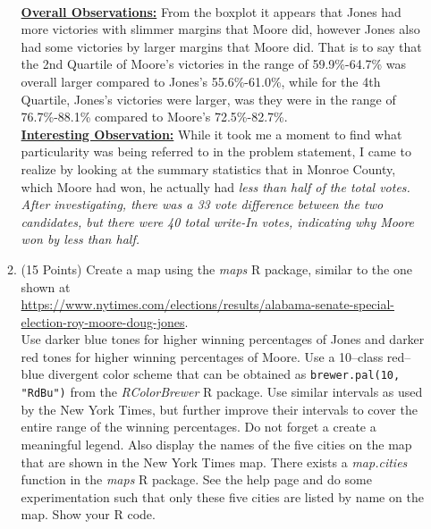 \documentclass[12pt,letterpaper,final]{article}
\begin{document}
\begin{enumerate}
\begin{enumerate}
{\\ \underline{\bf Overall Observations:} From the boxplot it appears that Jones had more victories with slimmer margins that Moore did, however Jones also had some victories by larger margins that Moore did.  That is to say that the 2nd Quartile of Moore's victories in the range of 59.9\%-64.7\% was overall larger compared to Jones's 55.6\%-61.0\%, while for the 4th Quartile, Jones's victories were larger, was they were in the range of 76.7\%-88.1\% compared to Moore's 72.5\%-82.7\%.\\
\underline{\bf Interesting Observation:} While it took me a moment to find what particularity was being referred to in the problem statement, I came to realize by looking at the summary statistics that in Monroe County, which Moore had won, he actually had \it{less} than half of the total votes.  After investigating, there was a 33 vote difference between the two candidates, but there were 40 total write-In votes, indicating why Moore won by less than half.
}


\item (15 Points) 
Create a map using the {\it maps} R package, similar to the one shown at \\
{\scriptsize
\url{https://www.nytimes.com/elections/results/alabama-senate-special-election-roy-moore-doug-jones}}. \\
Use darker blue tones for higher winning percentages of Jones and
darker red tones for higher winning percentages of Moore.
Use a 10--class red--blue divergent color scheme
that can be obtained as \verb|brewer.pal(10, "RdBu")| from the {\it RColorBrewer} R package.
Use similar intervals as used by the New York Times, but further improve their intervals
to cover the entire range of the winning percentages.
Do not forget a create a meaningful legend.
Also display the names of the five cities on the map that are shown in the New York Times map.
There exists a {\it map.cities} function in the {\it maps} R package. See the help
page and do some experimentation such that only these five cities are listed by name on the map.
Show your R code. \\



\end{enumerate}
\end{enumerate}
\end{document}
